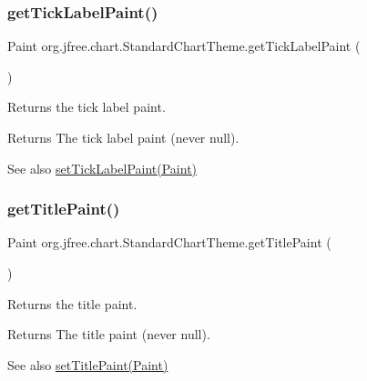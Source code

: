 \subsubsection{\texorpdfstring{get\+Tick\+Label\+Paint()}{getTickLabelPaint()}}
{\footnotesize\ttfamily Paint org.\+jfree.\+chart.\+Standard\+Chart\+Theme.\+get\+Tick\+Label\+Paint (\begin{DoxyParamCaption}{ }\end{DoxyParamCaption})}

Returns the tick label paint.

\begin{DoxyReturn}{Returns}
The tick label paint (never {\ttfamily null}).
\end{DoxyReturn}
\begin{DoxySeeAlso}{See also}
\mbox{\hyperlink{classorg_1_1jfree_1_1chart_1_1_standard_chart_theme_a374d333d9b261f619420273d8ca062f3}{set\+Tick\+Label\+Paint(\+Paint)}} 
\end{DoxySeeAlso}
\mbox{\label{classorg_1_1jfree_1_1chart_1_1_standard_chart_theme_adf952b6f9c7dcb070504b6adb17fa459}} 
\subsubsection{\texorpdfstring{get\+Title\+Paint()}{getTitlePaint()}}
{\footnotesize\ttfamily Paint org.\+jfree.\+chart.\+Standard\+Chart\+Theme.\+get\+Title\+Paint (\begin{DoxyParamCaption}{ }\end{DoxyParamCaption})}

Returns the title paint.

\begin{DoxyReturn}{Returns}
The title paint (never {\ttfamily null}).
\end{DoxyReturn}
\begin{DoxySeeAlso}{See also}
\mbox{\hyperlink{classorg_1_1jfree_1_1chart_1_1_standard_chart_theme_a341d5ca7e783e7db475b0e0d9508ff42}{set\+Title\+Paint(\+Paint)}} 
\end{DoxySeeAlso}
\mbox{\label{classorg_1_1jfree_1_1chart_1_1_standard_chart_theme_af3f47a3bc67bcc6e31299eb75e19bd2c}} 
